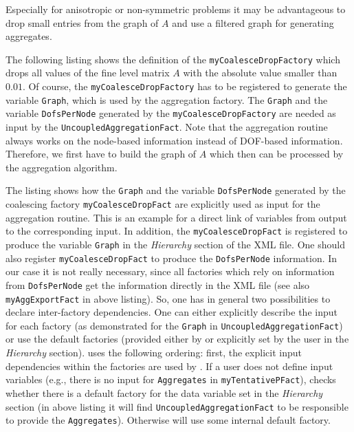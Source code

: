 \documentclass[10pt,fleqn]{book}
\begin{document}
Especially for anisotropic or non-symmetric problems it may be advantageous to drop small entries from the graph of $A$ and use a filtered graph for generating aggregates.

The following listing shows the definition of the \verb|myCoalesceDropFactory| which drops all values of the fine level matrix $A$ with the absolute value smaller than $0.01$. Of course, the \verb|myCoalesceDropFactory| has to be registered to generate the variable \verb|Graph|, which is used by the aggregation factory.
The \verb|Graph| and the variable \verb|DofsPerNode| generated by the \verb|myCoalesceDropFactory| are needed as input by the \verb|UncoupledAggregationFact|. Note that the aggregation routine always works on the node-based information instead of DOF-based information. Therefore, we first have to build the graph of $A$ which then can be processed by the aggregation algorithm.



The listing shows how the \verb|Graph| and the variable \verb|DofsPerNode| generated by the coalescing factory \verb|myCoalesceDropFact| are explicitly used as input for the aggregation routine. This is an example for a direct link of variables from output to the corresponding input. In addition, the \verb|myCoalesceDropFact| is registered to produce the variable \verb|Graph| in the \textit{Hierarchy} section of the XML file. One should also register \verb|myCoalesceDropFact| to produce the \verb|DofsPerNode| information. In our case it is not really necessary, since all factories which rely on information from \verb|DofsPerNode| get the information directly in the XML file (see also \verb|myAggExportFact| in above listing). So, one has in general two possibilities to declare inter-factory dependencies. One can either explicitly describe the input for each factory (as demonstrated for the \verb|Graph| in \verb|UncoupledAggregationFact|) or use the default factories (provided either by \muelu or explicitly
set by the user in the \textit{Hierarchy} section). \muelu uses the following ordering: first, the explicit input dependencies within the factories are used by \muelu. If a user does not define input variables (e.g., there is no input for \verb|Aggregates| in \verb|myTentativePFact|), \muelu checks whether there is a default factory for the data variable set in the \textit{Hierarchy} section (in above listing it will find \verb|UncoupledAggregationFact| to be responsible to provide the \verb|Aggregates|). Otherwise \muelu will use some internal default factory.
\end{document}
